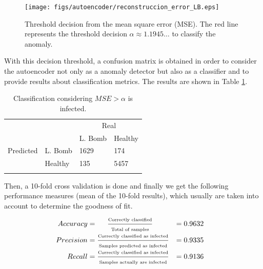 \documentclass{iosart2c}
\begin{document}
\begin{figure}[h!]
\centering
\texttt{[image: figs/autoencoder/reconstruccion\_error\_LB.eps]}
\caption{Threshold decision from the mean square error (MSE). The red line represents the threshold decision $\alpha\approx1.1945\ldots$ to classify the anomaly.}
\label{fig:reconstuction_LB}
\end{figure}

With this decision threshold, a confusion matrix is obtained in order to consider the autoencoder not only as a anomaly detector but also as a classifier and to provide results about classification metrics. The results are shown in Table \ref{confusion_matrix}. \\


\begin{table}[h!]
\centering
\begin{tabular}{llll}
                                                &                                 & \multicolumn{2}{c}{Real}                                       \\ \cline{3-4} 
                                                & \multicolumn{1}{l|}{}           & \multicolumn{1}{l|}{L. Bomb} & \multicolumn{1}{l|}{Healthy} \\ \cline{2-4} 
\multicolumn{1}{c|}{Predicted} & \multicolumn{1}{l|}{L. Bomb} & \multicolumn{1}{l|}{1629}       & \multicolumn{1}{l|}{174}     \\ \cline{2-4} 
\multicolumn{1}{c|}{}                           & \multicolumn{1}{l|}{Healthy}    & \multicolumn{1}{l|}{135}        & \multicolumn{1}{l|}{5457}    \\ \cline{2-4} 
\vspace{0.001cm}
\end{tabular}
\caption{Classification considering  $MSE>\alpha$ is infected.}
\label{confusion_matrix}
\end{table}

Then, a 10-fold cross validation is done and finally we get the following performance measures (mean of the 10-fold results), which usually are taken into account to determine the goodness of fit.

\begin{equation*}
\begin{aligned}
\hspace{-0.3cm} Accuracy  &= \hspace{0.5cm} \frac{\text{\tiny{Correctly classified}}}{\text{\tiny{Total of samples}}}           &= 0.9632 \\
\hspace{-0.3cm} Precision &=\frac{\text{\tiny{Correctly classified as infected}}}{\text{\tiny{Samples predicted as infected}}} &= 0.9335\\
\hspace{-0.3cm} Recall    &=\frac{\text{\tiny{Correctly classified as infected}}}{\text{\tiny{Samples actually are infected}}} &= 0.9136\\
\end{aligned}
\end{equation*}
\end{document}
